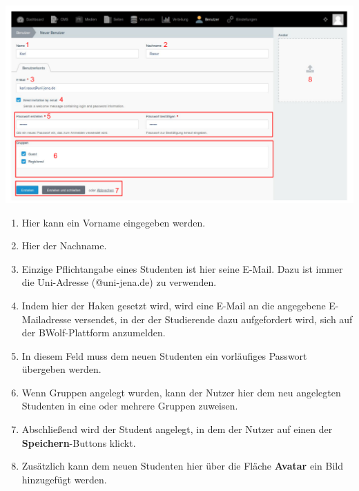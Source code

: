  
  \includegraphics[scale=0.3]{backend/img/neuer_benutzer.pdf}
  \begin{enumerate}
   \item Hier kann ein Vorname eingegeben werden.
   \item Hier der Nachname.
   \item Einzige Pflichtangabe eines Studenten ist hier seine E-Mail. Dazu ist immer die Uni-Adresse (@uni-jena.de) zu verwenden.
   \item Indem hier der Haken gesetzt wird, wird eine E-Mail an die angegebene E-Mailadresse versendet, in der der Studierende dazu aufgefordert wird, sich auf der BWolf-Plattform anzumelden.
   \item In diesem Feld muss dem neuen Studenten ein vorläufiges Passwort übergeben werden.
   \item Wenn Gruppen angelegt wurden, kann der Nutzer hier dem neu angelegten Studenten in eine oder mehrere Gruppen zuweisen.
   \item Abschließend wird der Student angelegt, in dem der Nutzer auf einen der \textbf{Speichern}-Buttons klickt.
   \item Zusätzlich kann dem neuen Studenten hier über die Fläche \textbf{Avatar} ein Bild hinzugefügt werden.
  \end{enumerate}

